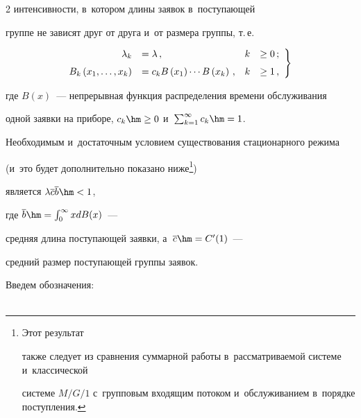 \begin{multicols}{2}
интенсивности, в~котором длины заявок в~по\-сту\-па\-ющей


группе не зависят друг от друга и~от размера группы, т.\,е.


\begin{equation}


\left.


\begin{array}{rlrl}


\hspace*{-2mm}\lambda_k&=\lambda\,, & k&\ge 0\,;\\[6pt]


\hspace*{-2mm}B_k\left(x_1,\ld,x_k\right)&=


c_k B\left(x_1\right)\cdots B\left(x_k\right)\,, &


k &\ge 1\,,


\end{array}


\right\}


\label{us1}


\end{equation}





\noindent где $B(x)$~--- непрерывная функция распределения времени обслуживания


одной заявки на приборе, $c_k \hm\ge 0$ и~$\sum\nolimits_{k=1}^\infty c_k\hm=1$.


Необходимым и~достаточным условием существования стационарного режима 


(и~это будет дополнительно показано ниже\footnote{Этот результат  


также следует из сравнения суммарной работы в~рассматриваемой системе и~классической 


системе $M/G/1$ с~групповым входящим потоком и~обслуживанием в~порядке поступления.})


является $\lambda \overline{c}  \overline{b}\hm < 1$,


где $\overline{b}\hm=\int\nolimits_0^\infty x  dB(x)$~--- 


средняя длина поступающей заявки, а~$\overline{c}\hm=C'(1)$~--- 


средний размер поступающей группы заявок.








Введем обозначения:


\begin{gather*}



\end{gather*}
\end{multicols}
